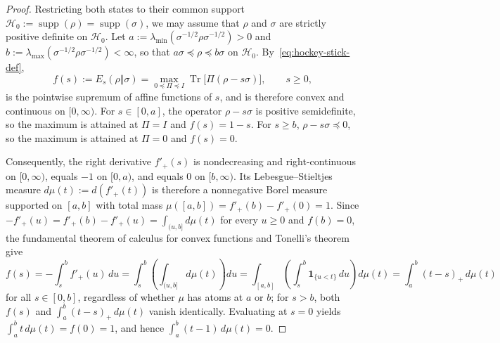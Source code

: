 \documentclass[10pt,a4paper]{article}
\numberwithin{equation}{section}
\theoremstyle{plain}
\theoremstyle{definition}
\theoremstyle{remark}
\DeclareMathOperator{\Tr}{Tr}
\DeclareMathOperator{\supp}{supp}
\newcommand{\cH}{\mathcal{H}}
\begin{document}
\begin{proof}
Restricting both states to their common support $\cH_0 := \supp(\rho) = \supp(\sigma)$, we may assume that $\rho$ and $\sigma$ are strictly positive definite on $\cH_0$. Let $a := \lambda_{\min}(\sigma^{-1/2}\rho\sigma^{-1/2}) > 0$ and $b := \lambda_{\max}(\sigma^{-1/2}\rho\sigma^{-1/2}) < \infty$, so that $a\sigma \preceq \rho \preceq b\sigma$ on $\cH_0$. By~\eqref{eq:hockey-stick-def},
\[
f(s) := E_s(\rho \Vert \sigma) = \max_{0 \preceq \Pi \preceq I} \Tr\!\bigl[\Pi(\rho - s\sigma)\bigr], \qquad s \ge 0,
\]
is the pointwise supremum of affine functions of $s$, and is therefore convex and continuous on $[0,\infty)$. For $s \in [0,a]$, the operator $\rho - s\sigma$ is positive semidefinite, so the maximum is attained at $\Pi = I$ and $f(s) = 1 - s$. For $s \ge b$, $\rho - s\sigma \preceq 0$, so the maximum is attained at $\Pi = 0$ and $f(s) = 0$.

Consequently, the right derivative $f'_+(s)$ is nondecreasing and right-continuous on $[0,\infty)$, equals $-1$ on $[0,a)$, and equals $0$ on $[b,\infty)$. Its Lebesgue--Stieltjes measure $d\mu(t) := d(f'_+(t))$ is therefore a nonnegative Borel measure supported on $[a,b]$ with total mass $\mu([a,b]) = f'_+(b) - f'_+(0) = 1$. Since $-f'_+(u) = f'_+(b) - f'_+(u) = \int_{(u,b]} d\mu(t)$ for every $u \ge 0$ and $f(b) = 0$, the fundamental theorem of calculus for convex functions and Tonelli's theorem give
\[
f(s) = -\int_s^b f'_+(u)\, du = \int_s^b \left(\int_{(u,b]} d\mu(t)\right) du = \int_{[a,b]} \left(\int_s^b \mathbf{1}_{\{u < t\}}\, du\right) d\mu(t) = \int_a^b (t - s)_+\, d\mu(t)
\]
for all $s \in [0, b]$, regardless of whether $\mu$ has atoms at $a$ or $b$; for $s > b$, both $f(s)$ and $\int_a^b (t - s)_+\, d\mu(t)$ vanish identically. Evaluating at $s = 0$ yields $\int_a^b t\, d\mu(t) = f(0) = 1$, and hence $\int_a^b (t - 1)\, d\mu(t) = 0$.


\end{proof}
\end{document}
